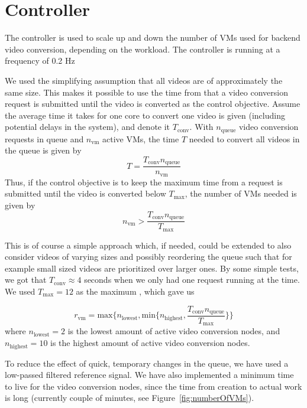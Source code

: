 \documentclass[a4paper, 10pt, english]{article}
\begin{document}
\section{Controller} \label{sec:Controller}
The controller is used to scale up and down the number of VMs used for backend video conversion, depending on the workload. The controller is running at a frequency of 0.2 Hz

We used the simplifying assumption that all videos are of approximately the same size. This makes it possible to use the time from that a video conversion request is submitted until the video is converted as the control objective. Assume the average time it takes for one core to convert one video is given (including potential delays in the system), and denote it $ T_{\text{conv}} $. With $ n_{\text{queue}} $ video conversion requests in queue and $ n_{\text{vm}} $ active VMs, the time $ T $ needed to convert all videos in the queue is given by
\begin{equation}
T = \frac{T_{\text{conv}}  n_{\text{queue}}}{n_{\text{vm}}}
\end{equation}
Thus, if the control objective is to keep the maximum time from a request is submitted until the video is converted below $ T_{\text{max}} $, the number of VMs needed is given by
\begin{equation}
n_{\text{vm}} > \frac{T_{\text{conv}}  n_{\text{queue}}}{T_{\text{max}}}
\end{equation}

This is of course a simple approach which, if needed, could be extended to also consider videos of varying sizes and possibly reordering the queue such that for example small sized videos are prioritized over larger ones. By some simple tests, we got that $T_{\text{conv}} \approx 4$ seconds when we only had one request running at the time. We used $T_{\text{max}} = 12$ as the maximum , which gave us

\begin{equation*}
	r_{\text{vm}} = \text{max}\{n_{\text{lowest}}, \text{min}\{n_{\text{highest}}, \frac{T_{\text{conv}}  n_{\text{queue}}}{T_{\text{max}}}\} \}
\end{equation*} 
where $n_{\text{lowest}} = 2$ is the lowest amount of  active video conversion nodes, and $n_{\text{highest}} = 10$ is the highest amount of active video conversion nodes. 

To reduce the effect of quick, temporary  changes in the queue, we have used a low-passed filtered reference signal. We have also implemented a minimum time to live for the video conversion nodes, since the time from creation to actual work is long (currently couple of minutes, see Figure~\ref{fig:numberOfVMs}).
\end{document}

